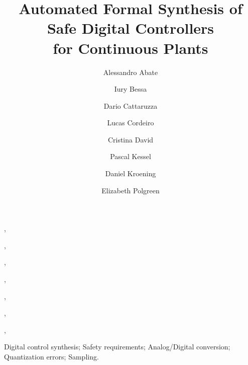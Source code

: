 \documentclass[twocolumn]{autart}    %
\begin{document}
\newcommand\tool{{\sf DSSynth}}
\begin{frontmatter}



\title{Automated Formal Synthesis of Safe Digital Controllers\\
for Continuous Plants}


\author[oxford]{Alessandro Abate},
\author[manaus]{Iury Bessa},
\author[oxford]{Dario Cattaruzza},
\author[manchester]{Lucas Cordeiro},
\author[cambridge]{Cristina David},
\author[oxford]{Pascal Kessel},
\author[oxford]{Daniel Kroening},
\author[oxford]{Elizabeth Polgreen}

\address[oxford]{University of Oxford, UK}
\address[cambridge]{University of Cambridge, UK}
\address[manchester]{University of Manchester, UK}
\address[manaus]{Federal University of Amazonas, Brazil} 
          
\begin{keyword}                           %
Digital control synthesis; Safety requirements; Analog/Digital conversion; Quantization errors; Sampling.               %
\end{keyword}                             %




\end{frontmatter}
\end{document}

